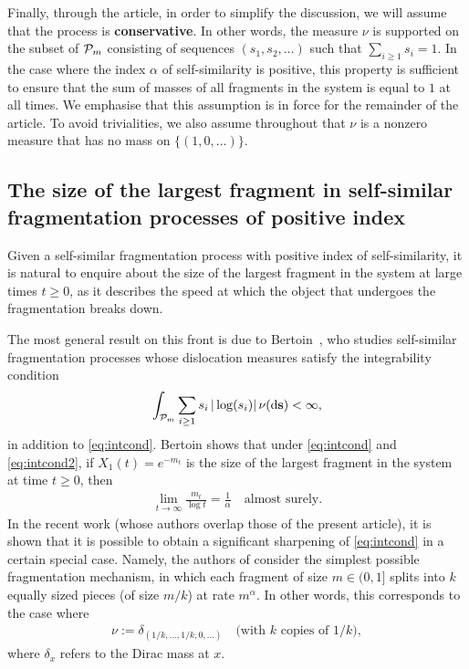 \documentclass[a4,12pt]{amsart}
\numberwithin{equation}{section}
\newcommand{\MassP}{\mathcal{P}_{\rm m}}
\begin{document}
	Finally, through the article, in order to simplify the discussion, we will assume that the 
	process is \textbf{conservative}. In other words, the measure $\nu$ is supported on the 
	subset of $\MassP$ consisting of sequences $(s_1,s_2,\ldots)$ such that 
	$\sum_{i \geq 1}s_i  =1$. In the case where the index $\alpha $ of self-similarity is 
	positive, this property is sufficient to ensure that the sum of masses of all fragments 
	in the system is equal to $1$ at all times. We emphasise that this assumption is in force 
	for the remainder of the article. 
	To avoid trivialities, we also assume throughout that 
	$\nu$ is a nonzero measure that has no mass on $\{(1,0,\ldots)\}$. 

\subsection{The size of the largest fragment in self-similar fragmentation processes of positive index}

	Given a self-similar fragmentation process with positive index of self-similarity, 
	it is natural to enquire about the size of the largest fragment in the 
	system at large times $t\geq 0$, as it describes the speed at which the object that 
	undergoes the fragmentation breaks down. 

	The most general result on this front is due to Bertoin~\cite{bertoin3}, who
	studies self-similar fragmentation processes whose dislocation measures 
	satisfy the integrability condition
	\begin{align} \label{eq:intcond2}
    	\int_{\MassP} \sum_{i \geq 1} s_i \, |\log(s_i)| \, \nu(\mathrm{d}\mathbf{s}) < \infty,
    \end{align}
    in addition to \eqref{eq:intcond}.
    Bertoin shows that under \eqref{eq:intcond} and \eqref{eq:intcond2},  
    if $X_1(t) = e^{ - m_t }$ is the size of the largest fragment 
	in the system at time $t \geq 0$, then
    \begin{align} \label{eq:bertoin}
        \lim_{t \to \infty} \frac{m_t}{\log t} = \frac{1}{\alpha} \quad \text{almost surely}.
	\end{align}
	In the recent work \cite{DGJPS} (whose authors overlap those of the present article), 
	it is shown that it is possible to obtain a significant sharpening of \eqref{eq:intcond} in 
	a certain special case. Namely, the authors of \cite{DGJPS} consider the simplest 
	possible fragmentation mechanism, in which each fragment of size $m \in (0,1]$ 
	splits into $k$ equally sized pieces (of size $m/k$) at rate $m^\alpha$.
	In other words, this corresponds to the case where
	\begin{align} \label{eq:kfrag}
    		\nu := \delta_{(1/k, \ldots, 1/k, 0, \ldots)} \quad \text{(with $k$ copies of $1/k$)},
	\end{align}
	where $\delta_x$ refers to the Dirac mass at $x$.
\end{document}

